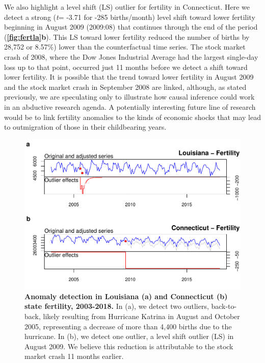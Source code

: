 \documentclass[12pt]{article}
\begin{document}
We also highlight a level shift (LS) outlier for fertility in
Connecticut. Here we detect a strong (\emph{t}= -3.71 for -285
births/month) level shift toward lower fertility beginning in August
2009 (2009:08) that continues through the end of the period
(\textbf{\autoref{fig:fertla}b}). This LS toward lower fertility reduced
the number of births by 28,752 or 8.57\%) lower than the counterfactual
time series. The stock market crash of 2008, where the Dow Jones
Industrial Average had the largest single-day loss up to that point,
occurred just 11 months before we detect a shift toward lower fertility.
It is possible that the trend toward lower fertility in August 2009 and
the stock market crash in September 2008 are linked, although, as stated
previously, we are speculating only to illustrate how causal inference
could work in an abductive research agenda. A potentially interesting
future line of research would be to link fertility anomalies to the
kinds of economic shocks that may lead to outmigration of those in their
childbearing years.

\begin{figure}
\centering
\includegraphics{manuscript_files/figure-latex/FertilityAnomalies-1.pdf}
\caption{\textbf{Anomaly detection in Louisiana (a) and Connecticut (b) state fertility, 2003-2018.}
In (a), we detect two outliers, back-to-back, likely resulting from
Hurricane Katrina in August and October 2005, representing a decrease of
more than 4,400 births due to the hurricane. In (b), we detect one
outlier, a level shift outlier (LS) in August 2009. We believe this
reduction is attributable to the stock market crash 11 months earlier.
\label{fig:fertla}}
\end{figure}
\end{document}
